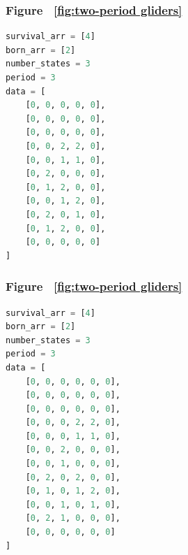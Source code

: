 \documentclass[12pt]{article}
\numberwithin{figure}{section} %
\begin{document}
\noindent\begin{minipage}{.45\textwidth}
\subsubsection{Figure ~\ref{fig:two-period gliders}}
\label{subsubsection:two-period gliders(2/5)}
\begin{lstlisting}[language = Python]
survival_arr = [4]
born_arr = [2]
number_states = 3
period = 3
data = [
    [0, 0, 0, 0, 0],
    [0, 0, 0, 0, 0],
    [0, 0, 0, 0, 0],
    [0, 0, 2, 2, 0],
    [0, 0, 1, 1, 0],
    [0, 2, 0, 0, 0],
    [0, 1, 2, 0, 0],
    [0, 0, 1, 2, 0],
    [0, 2, 0, 1, 0],
    [0, 1, 2, 0, 0],
    [0, 0, 0, 0, 0]
]
\end{lstlisting}
\end{minipage}\hfill
\begin{minipage}{.45\textwidth}
\subsubsection{Figure ~\ref{fig:two-period gliders}}
\label{subsubsection:two-period gliders(3/5)}
\begin{lstlisting}[language = Python]
survival_arr = [4]
born_arr = [2]
number_states = 3
period = 3
data = [
    [0, 0, 0, 0, 0, 0],
    [0, 0, 0, 0, 0, 0],
    [0, 0, 0, 0, 0, 0],
    [0, 0, 0, 2, 2, 0],
    [0, 0, 0, 1, 1, 0],
    [0, 0, 2, 0, 0, 0],
    [0, 0, 1, 0, 0, 0],
    [0, 2, 0, 2, 0, 0],
    [0, 1, 0, 1, 2, 0],
    [0, 0, 1, 0, 1, 0],
    [0, 2, 1, 0, 0, 0],
    [0, 0, 0, 0, 0, 0]
]
\end{lstlisting}
\end{minipage}
\end{document}
